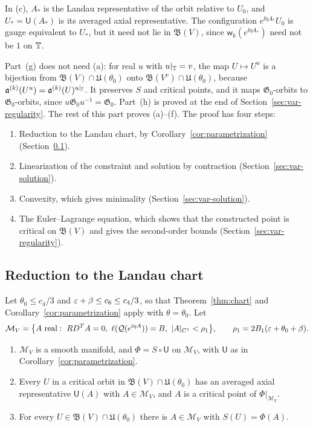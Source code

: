 In (c), $A_*$ is the Landau representative of the orbit relative to $U_0$, and $U_*=\mathsf U(A_*)$ is its averaged axial representative. The configuration $e^{\ii\eta A_*}U_0$ is gauge equivalent to $U_*$, but it need not lie in $\mathfrak B(V)$, since $\mathsf w_k(e^{\ii\eta A_*})$ need not be $1$ on $\mathbb T$.

Part~(g) does not need (a): for real $u$ with $u|_\mathbb T=v$, the map $U\mapsto U^u$ is a bijection from $\mathfrak B(V)\cap\mathfrak U(\theta_0)$ onto $\mathfrak B(V^v)\cap\mathfrak U(\theta_0)$, because $\mathfrak a^{(k)}(U^u)=\mathfrak a^{(k)}(U)^{u|_\mathbb T}$. It preserves $S$ and critical points, and it maps $\mathfrak G_0$-orbits to $\mathfrak G_0$-orbits, since $u\mathfrak G_0u^{-1}=\mathfrak G_0$. Part~(h) is proved at the end of Section~\ref{sec:var-regularity}. The rest of this part proves (a)--(f). The proof has four steps:
\begin{enumerate}[label=\arabic*.]
\item Reduction to the Landau chart, by Corollary~\ref{cor:parametrization} (Section~\ref{subsec:reduction}).
\item Linearization of the constraint and solution by contraction (Section~\ref{sec:var-solution}).
\item Convexity, which gives minimality (Section~\ref{sec:var-solution}).
\item The Euler--Lagrange equation, which shows that the constructed point is critical on $\mathfrak B(V)$ and gives the second-order bounds (Section~\ref{sec:var-regularity}).
\end{enumerate}

\subsection{Reduction to the Landau chart}\label{subsec:reduction}

Let $\theta_0\le c_4/3$ and $\varepsilon+\beta\le c_6\le c_4/3$, so that Theorem~\ref{thm:chart} and Corollary~\ref{cor:parametrization} apply with $\theta=\theta_0$. Let
\[
\mathcal M_V=\big\{A\ \text{real}:\ RD^TA=0,\ \ell(\mathcal Q(e^{\ii\eta A}))=B,\ |A|_{C^1}<\rho_1\big\},\qquad\rho_1=2B_1(\eps+\theta_0+\beta).
\]

\begin{lemma}\label{lem:reduction}
\begin{enumerate}[label=(\alph*)]
\item $\mathcal M_V$ is a smooth manifold, and $\Phi=S\circ\mathsf U$ on $\mathcal M_V$, with $\mathsf U$ as in Corollary~\ref{cor:parametrization}.
\item Every $U$ in a critical orbit in $\mathfrak B(V)\cap\mathfrak U(\theta_0)$ has an averaged axial representative $\mathsf U(A)$ with $A\in\mathcal M_V$, and $A$ is a critical point of $\Phi|_{\mathcal M_V}$.
\item For every $U\in\mathfrak B(V)\cap\mathfrak U(\theta_0)$ there is $A\in\mathcal M_V$ with $S(U)=\Phi(A)$.
\end{enumerate}
\end{lemma}

